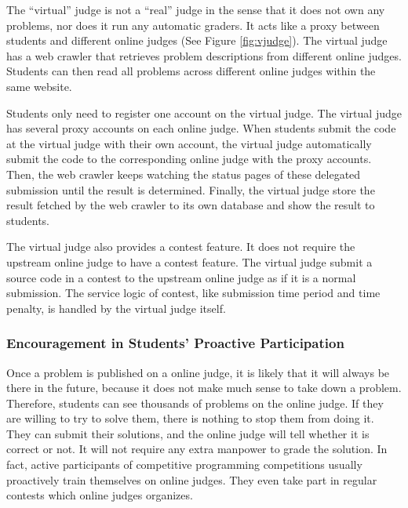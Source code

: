             The ``virtual'' judge is not a ``real'' judge in the sense that it does not own any problems,
            nor does it run any automatic graders.
            It acts like a proxy between students and different online judges (See Figure \ref{fig:vjudge}).
            The virtual judge has a web crawler that retrieves problem descriptions from different online judges.
            Students can then read all problems across different online judges within the same website.

            Students only need to register one account on the virtual judge.
            The virtual judge has several proxy accounts on each online judge.
            When students submit the code at the virtual judge with their own account,
            the virtual judge automatically submit the code to the corresponding online judge
            with the proxy accounts.
            Then, the web crawler keeps watching the status pages of these delegated submission
            until the result is determined.
            Finally, the virtual judge store the result fetched by the web crawler to its own database
            and show the result to students.

            The virtual judge also provides a contest feature.
            It does not require the upstream online judge to have a contest feature.
            The virtual judge submit a source code in a contest to the upstream online judge
            as if it is a normal submission.
            The service logic of contest, like submission time period and time penalty, is handled
            by the virtual judge itself.

        \subsubsection{Encouragement in Students' Proactive Participation}

            Once a problem is published on a online judge,
            it is likely that it will always be there in the future,
            because it does not make much sense to take down a problem.
            Therefore, students can see thousands of problems on the online judge.
            If they are willing to try to solve them,
            there is nothing to stop them from doing it.
            They can submit their solutions,
            and the online judge will tell whether it is correct or not.
            It will not require any extra manpower to grade the solution.
            In fact, active participants of competitive programming competitions usually proactively
            train themselves on online judges.
            They even take part in regular contests which online judges organizes.

